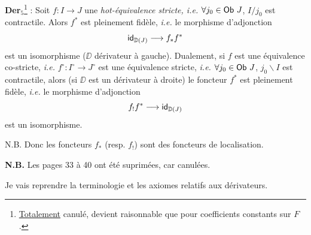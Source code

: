 \textbf{Der}$_5$\footnote[10]{\underline{Totalement} canulé, devient raisonnable que pour coefficients constants sur $F$.} : Soit $f : I \to J$ une \textit{hot-équivalence stricte, i.e.} $\forall j_0 \in \mathsf{Ob}\ J$, $I/j_0$ est contractile. Alors $f^*$ est pleinement fidèle, \textit{i.e.} le morphisme d'adjonction
\[ \mathsf{id}_{\mathbb{D}(J)} \longrightarrow f_* f^* \]
est un isomorphisme ($\DD$ dérivateur à gauche). Dualement, si $f$ est une équivalence co-stricte, \textit{i.e.} $f^\circ : I^\circ \to J^\circ$ est une équivalence stricte, \textit{i.e.} $\forall j_0 \in \mathsf{Ob}\ J$, $j_0 \backslash I$ est contractile, alors (si $\DD$ est un dérivateur à droite) le foncteur $f^*$ est pleinement fidèle, \textit{i.e.} le morphisme d'adjonction %
\[ f_! f^* \longrightarrow \mathsf{id}_{\mathbb{D}(J)} \]
est un isomorphisme.

N.B. Donc les foncteurs $f_*$ (resp. $f_!$) sont des foncteurs de localisation.

\textbf{N.B.} Les pages 33 à 40 ont été suprimées, car canulées. %

Je vais reprendre la terminologie et les axiomes relatifs aux dérivateurs.

